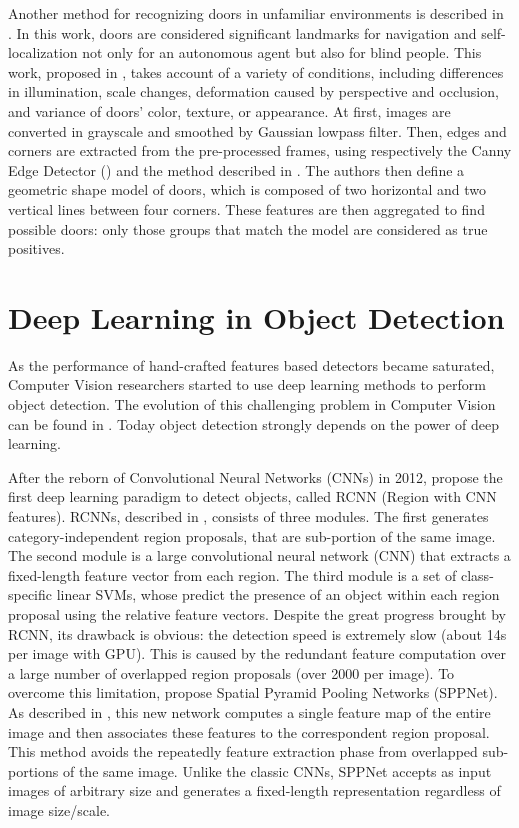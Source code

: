   Another method for recognizing doors in unfamiliar environments is described in \cite{edgeandcornerdoorsdetector}. In this work, doors are considered significant landmarks for navigation and self-localization not only for an autonomous agent but also for blind people. This work, proposed in \citeauthor{edgeandcornerdoorsdetector}, takes account of a variety of conditions, including differences in illumination, scale changes, deformation caused by perspective and occlusion, and variance of doors’ color, texture, or appearance. At first, images are converted in grayscale and smoothed by Gaussian lowpass filter. Then, edges and corners are extracted from the pre-processed frames, using respectively the Canny Edge Detector (\cite{canny}) and the method described in \cite{cornerdetector}. The authors then define a geometric shape model of doors, which is composed of two horizontal and two vertical lines between four corners. These features are then aggregated to find possible doors: only those groups that match the model are considered as true positives.  
 
 \section{Deep Learning in Object Detection}
 As the performance of hand-crafted features based detectors became saturated, Computer Vision researchers started to use deep learning methods to perform object detection. The evolution of this challenging problem in Computer Vision can be found in \cite{computervisionsurvey}. Today object detection strongly depends on the power of deep learning. 
 
 
 After the reborn of Convolutional Neural Networks (CNNs) in 2012, \citeauthor{rcnn} propose the first deep learning paradigm to detect objects, called RCNN (Region with CNN features). RCNNs, described in \cite{rcnn}, consists of three modules. The first generates category-independent region proposals, that are sub-portion of the same image. The second module is a large convolutional neural network (CNN) that extracts a fixed-length feature
 vector from each region. The third module is a set of class-specific linear SVMs, whose predict the presence of an object within each region proposal using the relative feature vectors. Despite the great progress brought by RCNN, its drawback is obvious: the detection speed is extremely slow (about 14s per
 image with GPU). This is caused by the redundant feature computation over a large number of overlapped region proposals (over 2000 per image). To overcome this limitation, \citeauthor{sppnet} propose Spatial Pyramid Pooling Networks (SPPNet). As described in \cite{sppnet}, this new network computes a single feature map of the entire image and then associates these features to the correspondent region proposal. This method avoids the repeatedly feature extraction phase from overlapped sub-portions of the same image.  Unlike the classic CNNs, SPPNet accepts as input images of arbitrary size and generates a fixed-length representation regardless of image size/scale. 
 
